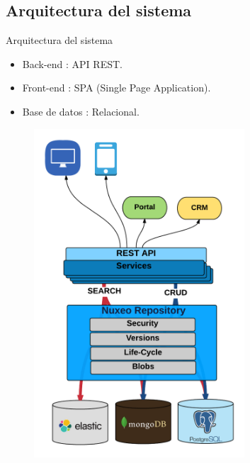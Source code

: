 \documentclass{beamer}
\begin{document}
\subsection{Arquitectura del sistema}

	\begin{frame}{Arquitectura del sistema}
		\begin{itemize}
			\item {
				Back-end : API REST.
				
			}
			\item {
				Front-end : SPA (Single Page Application).
			}
			\item {
				Base de datos : Relacional.
				
			}
		\end{itemize}
		
		
		\begin{figure}[h]
    		\centering
    		\includegraphics[width=0.7\textwidth, height=0.67\textheight]{images_latex/api}

		\end{figure}
	
	\end{frame}
\end{document}
